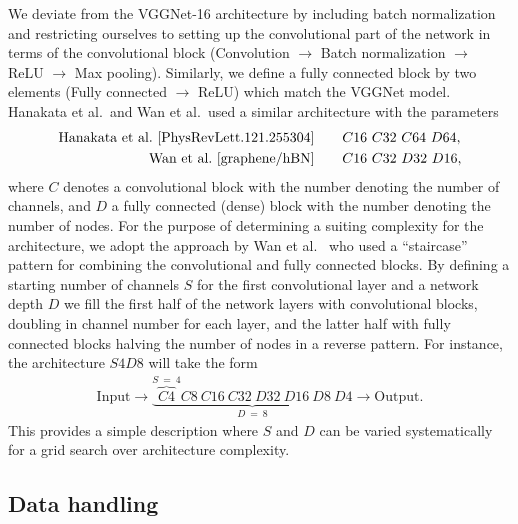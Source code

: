 We deviate from the VGGNet-16 architecture by including batch normalization and restricting ourselves to setting up the convolutional part of the network in terms of the convolutional block (Convolution $\to$ Batch normalization $\to$ ReLU $\to$ Max pooling). Similarly, we define a fully connected block by two elements (Fully connected $\to$ ReLU) which match the VGGNet model. Hanakata et al.\ and Wan et al.\ used a similar architecture with the parameters 
\begin{align*}
  \text{Hanakata et al.~\cite{PhysRevLett.121.255304}} & \qquad C16 \ C32 \ C64 \ D64, \\ 
  \text{Wan et al.~\cite{graphene/hBN}} & \qquad C16 \ C32 \ D32 \ D16,
\end{align*}
where $C$ denotes a convolutional block with the number denoting the number of channels, and $D$ a fully connected (dense) block with the number denoting the number of nodes. For the purpose of determining a suiting complexity for the architecture, we adopt the approach by Wan et al.~\cite{graphene/hBN} who used a ``staircase'' pattern for combining the convolutional and fully connected blocks. By defining a starting number of channels $S$ for the first convolutional layer and a network depth $D$ we fill the first half of the network layers with convolutional blocks, doubling in channel number for each layer, and the latter half with fully connected blocks halving the number of nodes in a reverse pattern. For instance, the architecture $S4D8$ will take the form
\begin{align}
  \text{Input} \to \underbrace{\overbrace{C4}^{S \ = \ 4}C8 \ C16 \ C32 \ D32 \ D16 \ D8 \ D4}_{D \ = \ 8} \to \text{Output}.
  \label{eq:staircase_example}
\end{align} 
This provides a simple description where $S$ and $D$ can be varied systematically for a grid search over architecture complexity. 


\subsection{Data handling}
